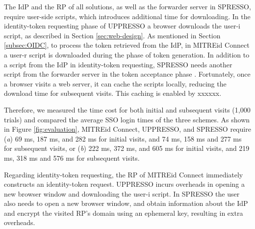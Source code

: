 The IdP and the RP of all solutions, as well as the forwarder server in SPRESSO,
     require user-side scripts, which introduces additional time for downloading. 
In the identity-token requesting phase of UPPRESSO a browser downloads the user-i script,
    as described in Section \ref{sec:web-design}.
As mentioned in Section \ref{subsec:OIDC},
 to process the token retrieved from the IdP, %
    in MITREid Connect a user-r script is downloaded during the phase of token generation.
In addition to a script from the IdP in identity-token requesting,
SPRESSO needs another script from the forwarder server in the token acceptance phase \cite{SPRESSO}.
Fortunately, once a browser visits a web server, it can cache the scripts locally, reducing the download time for subsequent visits. This caching is enabled by xxxxxx.

Therefore, we measured the time cost for both initial and subsequent visits (1,000 trials) and compared the average SSO login times of the three schemes.
As shown in Figure \ref{fig:evaluation},
MITREid Connect, UPPRESSO, and SPRESSO require (\emph{a}) 69 ms, 187 ms, and 282 ms for initial visits, and 74 ms, 158 ms and 277 ms for subsequent visits,
 or (\emph{b}) 222 ms, 372 ms, and 605 ms for initial visits, and 219 ms, 318 ms and 576 ms for subsequent visits.

Regarding identity-token requesting, %
the RP of MITREid Connect immediately constructs an identity-token request. %
UPPRESSO incurs overheads in opening a new browser window and downloading the user-i script.
%
%
In SPRESSO the user also needs to open a new browser window, and obtain information about the IdP %
and encrypt the visited RP's domain using an ephemeral key, resulting in extra overheads.

